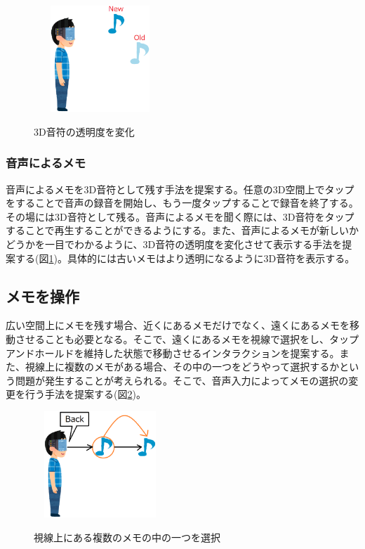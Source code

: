 \documentclass{hissymp}
\begin{document}
\begin{figure}[h]
  \begin{center}
    \includegraphics[clip,height=4.0cm,width=5.0cm]{./onpu_memo.eps}
    \caption{3D音符の透明度を変化}
    \label{fig:onpu_memo}
  \end{center}
\end{figure}

\subsubsection{音声によるメモ}
音声によるメモを3D音符として残す手法を提案する。任意の3D空間上でタップをすることで音声の録音を開始し、もう一度タップすることで録音を終了する。その場には3D音符として残る。音声によるメモを聞く際には、3D音符をタップすることで再生することができるようにする。また、音声によるメモが新しいかどうかを一目でわかるように、3D音符の透明度を変化させて表示する手法を提案する(図\ref{fig:onpu_memo})。具体的には古いメモはより透明になるように3D音符を表示する。


\subsection{メモを操作}
広い空間上にメモを残す場合、近くにあるメモだけでなく、遠くにあるメモを移動させることも必要となる。そこで、遠くにあるメモを視線で選択をし、タップアンドホールドを維持した状態で移動させるインタラクションを提案する。また、視線上に複数のメモがある場合、その中の一つをどうやって選択するかという問題が発生することが考えられる。そこで、音声入力によってメモの選択の変更を行う手法を提案する(図\ref{fig:sentaku_memo})。

\begin{figure}[h]
  \begin{center}
    \includegraphics[clip,height=4.0cm,width=5.0cm]{./sentaku_memo.eps}
    \caption{視線上にある複数のメモの中の一つを選択}
    \label{fig:sentaku_memo}
  \end{center}
\end{figure}
\end{document}
